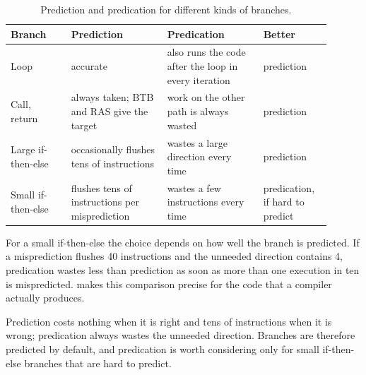 \documentclass[../main.tex]{subfiles}
\begin{document}
\begin{table}[htbp]
  \centering\small
  \caption{Prediction and predication for different kinds of branches.}
  \label{tab:l05-which}
  \begin{tabular}{@{}>{\raggedright\arraybackslash}p{0.17\linewidth}>{\raggedright\arraybackslash}p{0.27\linewidth}>{\raggedright\arraybackslash}p{0.27\linewidth}>{\raggedright\arraybackslash}p{0.19\linewidth}@{}}
    \toprule
    Branch & Prediction & Predication & Better \\
    \midrule
    Loop               & accurate
                       & also runs the code after the loop in every iteration
                       & prediction \\
    \addlinespace
    Call, return       & always taken; BTB and RAS give the target
                       & work on the other path is always wasted
                       & prediction \\
    \addlinespace
    Large if-then-else & occasionally flushes tens of instructions
                       & wastes a large direction every time
                       & prediction \\
    \addlinespace
    Small if-then-else & flushes tens of instructions per misprediction
                       & wastes a few instructions every time
                       & predication, if hard to predict \\
    \bottomrule
  \end{tabular}
\end{table}

For a small if-then-else the choice depends on how well the branch is
predicted.  If a misprediction flushes 40 instructions and the unneeded
direction contains 4, predication wastes less than prediction as soon as more
than one execution in ten is mispredicted.
 makes this comparison precise for the code that a
compiler actually produces.

\begin{keypoint}
  Prediction costs nothing when it is right and tens of instructions when it
  is wrong; predication always wastes the unneeded direction.  Branches are
  therefore predicted by default, and predication is worth considering only
  for small if-then-else branches that are hard to predict.
\end{keypoint}
\end{document}
